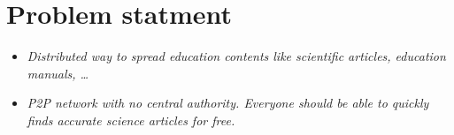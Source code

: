 \section{Problem statment}

\begin{itemize}
\item \textit{Distributed way to spread education contents like
scientific articles, education manuals, \ldots}
\item \textit{P2P network with no central authority. Everyone should be
able to quickly finds accurate science articles for free.}
\end{itemize}
